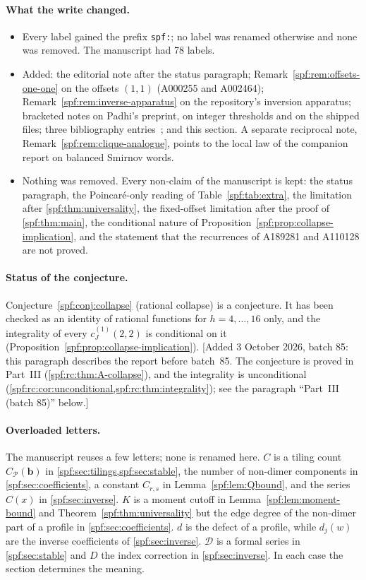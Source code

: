 \documentclass[11pt]{article}
\numberwithin{equation}{section}
\theoremstyle{definition}
\theoremstyle{remark}
\theoremstyle{definition}
\begin{document}
\paragraph{What the write changed.}
\begin{itemize}
\item Every label gained the prefix \texttt{spf:}; no label was renamed
 otherwise and none was removed. The manuscript had 78 labels.
\item Added: the editorial note after the status paragraph;
 Remark~\ref{spf:rem:offsets-one-one} on the offsets $(1,1)$ (A000255 and
 A002464); Remark~\ref{spf:rem:inverse-apparatus} on the repository's inversion
 apparatus; bracketed notes on Padhi's preprint, on integer thresholds and on
 the shipped files; three bibliography entries~\cite{oeis000255,oeis002464,tai};
 and this section. A separate reciprocal note, Remark~\ref{spf:rem:clique-analogue},
 points to the local law of the companion report on balanced Smirnov words.
\item Nothing was removed. Every non-claim of the manuscript is kept: the status
 paragraph, the Poincar\'e-only reading of Table~\ref{spf:tab:extra}, the
 limitation after \cref{spf:thm:universality}, the fixed-offset limitation
 after the proof of \cref{spf:thm:main}, the conditional nature of
 Proposition~\ref{spf:prop:collapse-implication}, and the statement that the
 recurrences of A189281 and A110128 are not proved.
\end{itemize}

\paragraph{Status of the conjecture.}
Conjecture~\ref{spf:conj:collapse} (rational collapse) is a conjecture. It has been
checked as an identity of rational functions for $h=4,\ldots,16$ only, and the
integrality of every $c_J^{(1)}(2,2)$ is conditional on it
(Proposition~\ref{spf:prop:collapse-implication}).
[Added 3 October 2026, batch 85: this paragraph describes the report before
batch~85. The conjecture is proved in Part~III
(\cref{spf:rc:thm:A-collapse}), and the integrality is unconditional
(\cref{spf:rc:cor:unconditional,spf:rc:thm:integrality}); see the
paragraph ``Part~III (batch 85)'' below.]

\paragraph{Overloaded letters.}
The manuscript reuses a few letters; none is renamed here. $C$ is a tiling
count $C_{\mathcal P}(\mathbf b)$ in \cref{spf:sec:tilings,spf:sec:stable}, the
number of non-dimer components in \cref{spf:sec:coefficients}, a constant
$C_{r,s}$ in Lemma~\ref{spf:lem:Qbound}, and the series $C(x)$ in
\cref{spf:sec:inverse}. $K$ is a moment cutoff in
Lemma~\ref{spf:lem:moment-bound} and Theorem~\ref{spf:thm:universality} but the edge degree of the
non-dimer part of a profile in \cref{spf:sec:coefficients}. $d$ is the
defect of a profile, while $d_j(w)$ are the inverse coefficients of
\cref{spf:sec:inverse}. $\mathcal D$ is a formal series in
\cref{spf:sec:stable} and $D$ the index correction in \cref{spf:sec:inverse}.
In each case the section determines the meaning.
\end{document}
